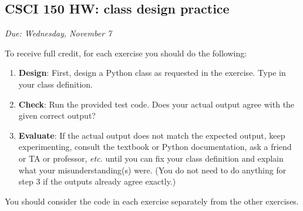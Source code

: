 \documentclass[]{article}
\date{}
\begin{document}
\subsection{CSCI 150 HW: class design
practice}\label{csci-150-hw-class-design-practice}

\emph{Due: Wednesday, November 7}

To receive full credit, for each exercise you should do the following:

\begin{enumerate}
\def\labelenumi{\arabic{enumi}.}
\item
  \textbf{Design}: First, design a Python class as requested in the
  exercise. Type in your class definition.
\item
  \textbf{Check}: Run the provided test code. Does your actual output
  agree with the given correct output?
\item
  \textbf{Evaluate}: If the actual output does not match the expected
  output, keep experimenting, consult the textbook or Python
  documentation, ask a friend or TA or professor, \emph{etc.} until you
  can fix your class definition and explain what your
  misunderstanding(s) were. (You do not need to do anything for step 3
  if the outputs already agree exactly.)
\end{enumerate}

You should consider the code in each exercise separately from the other
exercises.
\end{document}
